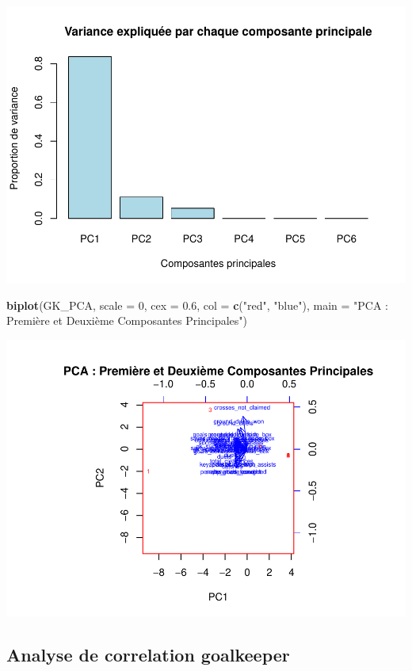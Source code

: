 \documentclass[
  6pt,
]{article}
\newenvironment{Shaded}{\begin{snugshade}}{\end{snugshade}}
\newcommand{\AttributeTok}[1]{\textcolor[rgb]{0.13,0.29,0.53}{#1}}
\newcommand{\DecValTok}[1]{\textcolor[rgb]{0.00,0.00,0.81}{#1}}
\newcommand{\FloatTok}[1]{\textcolor[rgb]{0.00,0.00,0.81}{#1}}
\newcommand{\FunctionTok}[1]{\textcolor[rgb]{0.13,0.29,0.53}{\textbf{#1}}}
\newcommand{\NormalTok}[1]{#1}
\newcommand{\StringTok}[1]{\textcolor[rgb]{0.31,0.60,0.02}{#1}}
\begin{document}
\includegraphics{Analyse_Impact_Performances_Joueurs_files/figure-latex/unnamed-chunk-2-1.pdf}

\begin{Shaded}
\begin{Highlighting}[]
\FunctionTok{biplot}\NormalTok{(GK\_PCA, }\AttributeTok{scale =} \DecValTok{0}\NormalTok{, }\AttributeTok{cex =} \FloatTok{0.6}\NormalTok{, }\AttributeTok{col =} \FunctionTok{c}\NormalTok{(}\StringTok{"red"}\NormalTok{, }\StringTok{"blue"}\NormalTok{), }\AttributeTok{main =} \StringTok{"PCA : Première et Deuxième Composantes Principales"}\NormalTok{)}
\end{Highlighting}
\end{Shaded}

\includegraphics{Analyse_Impact_Performances_Joueurs_files/figure-latex/unnamed-chunk-2-2.pdf}

\subsection{Analyse de correlation
goalkeeper}\label{analyse-de-correlation-goalkeeper}

\subsubsection{}\label{section}
\end{document}
